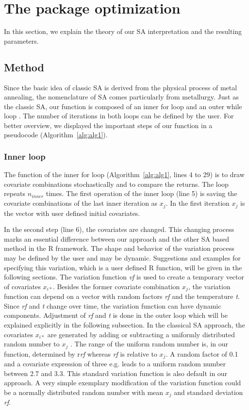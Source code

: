 \section{The package optimization}
In this section, we explain the theory of our SA interpretation and the resulting parameters.

\subsection{Method}
\label{subsec:method}
Since the basic idea of classic SA is derived from the physical process of metal annealing, the nomenclature of SA comes particularly from metallurgy. Just as the classic SA, our function is composed of an inner for loop and an outer while loop \citep{kirkpatrick_1983}. The number of iterations in both loops can be defined by the user. For better overview, we displayed the important steps of our function in a pseudocode (Algorithm~\ref{alg:alg1}).

\subsubsection{Inner loop}
The function of the inner for loop (Algorithm~\ref{alg:alg1}, lines 4 to 29) is to draw covariate combinations stochastically and to compare the returns. The loop repeats  $n_{inner}$  times. The first operation of the inner loop (line 5) is saving the covariate combinations of the last inner iteration as $x_j$. In the first iteration  $x_j$ is the vector with user defined initial covariates.

In the second step (line 6), the covariates are changed. This changing process marks an essential difference between our approach and the other SA based method in the R framework.  The shape and behavior of the variation process may be defined by the user and may be dynamic. Suggestions and examples for specifying this variation, which is a user defined R function, will be given in the following sections. The variation function \textit{vf} is used to create a temporary vector of covariates $x_{i*}$. Besides the former covariate combination $x_j$, the variation function can depend on a vector with random factors \textit{rf} and the temperature \textit{t}. Since \textit{rf} and \textit{t} change over time, the variation function can have dynamic components. Adjustment of \textit{rf} and \textit{t} is done in the outer loop which will be explained explicitly in the following subsection. In the classical SA approach, the covariates $x_{i*}$ are generated by adding or subtracting a uniformly distributed random number to $x_j$ \citep{kirkpatrick_1983}. The range of the uniform random number is, in our function, determined by r\textit{rf} whereas \textit{rf} is relative to $x_j$. A random factor of 0.1 and a covariate expression of three e.g. leads to a uniform random number between 2.7 and 3.3. This standard variation function is also default in our approach. A very simple exemplary modification of the variation function could be a normally distributed random number with mean $x_j$ and standard deviation \textit{rf}.

